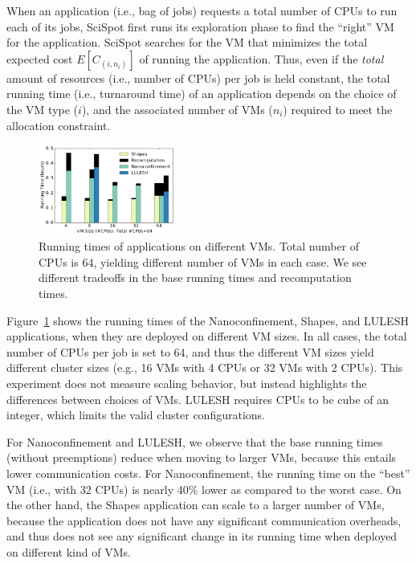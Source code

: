 \documentclass[compsoc]{IEEEtran}
\newcommand{\sysname}{SciSpot\xspace}
\newcommand{\myfigspace}[0]{-0.45cm}
\begin{document}
When an application (i.e., bag of jobs) requests a total number of CPUs to run each of its jobs, \sysname first runs its exploration phase to find the ``right'' VM for the application.
\sysname searches for the VM that minimizes the total expected cost $E[C_{(i,n_i)}]$ of running the application. 
Thus, even if the \emph{total} amount of resources (i.e., number of CPUs) per job is held constant, the total running time (i.e., turnaround time) of an application depends on the choice of the VM type ($i$), and the associated number of VMs ($n_i$) required to meet the allocation constraint. 

\begin{figure}
  \centering
  \includegraphics[width=0.4\textwidth]{runtime-bars.pdf}
      \vspace*{\myfigspace}
  \caption{Running times of applications on different VMs. Total number of CPUs is 64, yielding different number of VMs in each case. We see different tradeoffs in the base running times and recomputation times.}
  \label{fig:runtimes-bar}
    \vspace*{\myfigspace}
\end{figure}


Figure~\ref{fig:runtimes-bar} shows the running times of the Nanoconfinement, Shapes, and LULESH applications, when they are deployed on different VM sizes. 
In all cases, the total number of CPUs per job is set to 64, and thus the different VM sizes yield different cluster sizes (e.g., 16 VMs with 4 CPUs or 32 VMs with 2 CPUs).
This experiment does not measure scaling behavior, but instead highlights the differences between choices of VMs. 
LULESH requires CPUs to be cube of an integer, which limits the valid cluster configurations.


For Nanoconfinement and LULESH, we observe that the base running times (without preemptions) reduce when moving to larger VMs, because this entails lower communication costs.
For Nanoconfinement, the running time on the ``best'' VM (i.e., with 32 CPUs) is nearly 40\% lower as compared to the worst case. 
On the other hand, the Shapes application can scale to a larger number of VMs, because the application  does not have any significant communication overheads, and thus does not see any significant change in its running time when deployed on different kind of VMs. 
\end{document}
